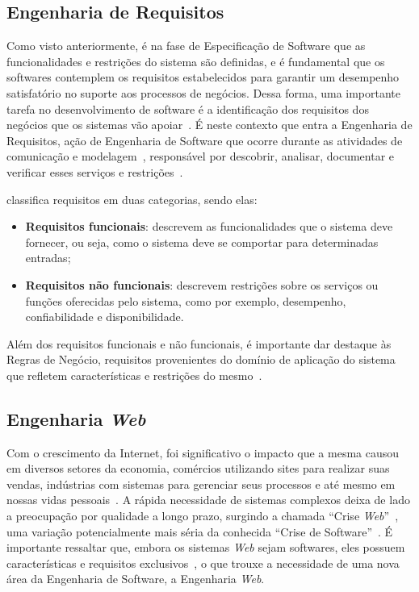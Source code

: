 \subsection{Engenharia de Requisitos}
\label{subsec-fundteo-engsoft-engreq}

Como visto anteriormente, é na fase de Especificação de Software que as funcionalidades 
e restrições do sistema são definidas, e é fundamental que os softwares contemplem os
requisitos estabelecidos para garantir um desempenho satisfatório no suporte aos processos 
de negócios. Dessa forma, uma importante tarefa no desenvolvimento de software é a
identificação dos requisitos dos negócios que os sistemas vão apoiar~\cite{falbo:2017}.
É neste contexto que entra a Engenharia de Requisitos, ação de Engenharia de 
Software que ocorre durante as atividades de comunicação e modelagem~\cite{pressman:2011},
responsável por descobrir, analisar, documentar e verificar esses serviços e restrições~\cite{sommerville:2011}. 

 classifica requisitos em duas categorias, sendo elas:

\begin{itemize}
    \item \textbf{Requisitos funcionais}: descrevem as funcionalidades que o sistema deve 
        fornecer, ou seja, como o sistema deve se comportar para determinadas entradas;
    \item \textbf{Requisitos não funcionais}: descrevem restrições sobre os serviços ou
        funções oferecidas pelo sistema, como por exemplo, desempenho, confiabilidade e 
        disponibilidade. 
\end{itemize}

Além dos requisitos funcionais e não funcionais, é importante dar destaque às Regras de
Negócio, requisitos provenientes do domínio de aplicação do sistema que refletem características
e restrições do mesmo~\cite{sommerville:2011,falbo:2014}.


\subsection{Engenharia \textit{Web}}
\label{subsec-fundteo-engsoft-engweb}

Com o crescimento da Internet, foi significativo o impacto que a mesma causou em diversos
setores da economia, comércios utilizando sites para realizar suas vendas, indústrias com
sistemas para gerenciar seus processos e até mesmo em nossas vidas pessoais~\cite{murugesan:2001}.
A rápida necessidade de sistemas complexos deixa de lado a preocupação por qualidade a longo prazo,
surgindo a chamada ``Crise \textit{Web}''~\cite{murugesan:2001}, uma variação potencialmente mais séria da 
conhecida ``Crise de Software''~\cite{gibbs:1994}. É importante ressaltar que, embora os sistemas \textit{Web}
sejam softwares, eles possuem características e requisitos exclusivos~\cite{pressman:2011},
o que trouxe a necessidade de uma nova área da Engenharia de Software, a Engenharia \textit{Web}.

